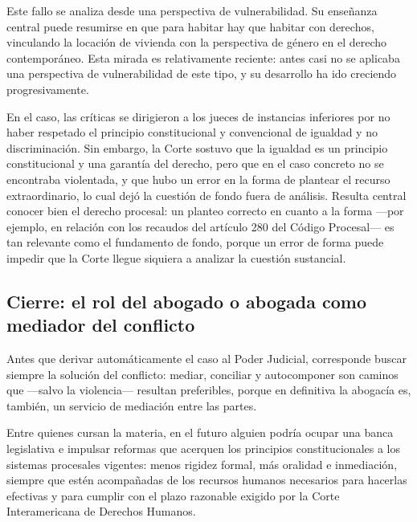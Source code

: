 \documentclass[12pt,oneside]{book}
\begin{document}
Este fallo se analiza desde una perspectiva de vulnerabilidad. Su enseñanza central puede resumirse en que para habitar hay que habitar con derechos, vinculando la locación de vivienda con la perspectiva de género en el derecho contemporáneo. Esta mirada es relativamente reciente: antes casi no se aplicaba una perspectiva de vulnerabilidad de este tipo, y su desarrollo ha ido creciendo progresivamente.

\begin{important}
En el caso, las críticas se dirigieron a los jueces de instancias inferiores por no haber respetado el principio constitucional y convencional de igualdad y no discriminación. Sin embargo, la Corte sostuvo que la igualdad es un principio constitucional y una garantía del derecho, pero que en el caso concreto no se encontraba violentada, y que hubo un error en la forma de plantear el recurso extraordinario, lo cual dejó la cuestión de fondo fuera de análisis. Resulta central conocer bien el derecho procesal: un planteo correcto en cuanto a la forma —por ejemplo, en relación con los recaudos del artículo 280 del Código Procesal— es tan relevante como el fundamento de fondo, porque un error de forma puede impedir que la Corte llegue siquiera a analizar la cuestión sustancial.
\end{important}

\subsection*{Cierre: el rol del abogado o abogada como mediador del conflicto}

Antes que derivar automáticamente el caso al Poder Judicial, corresponde buscar siempre la solución del conflicto: mediar, conciliar y autocomponer son caminos que —salvo la violencia— resultan preferibles, porque en definitiva la abogacía es, también, un servicio de mediación entre las partes.

\begin{note}
Entre quienes cursan la materia, en el futuro alguien podría ocupar una banca legislativa e impulsar reformas que acerquen los principios constitucionales a los sistemas procesales vigentes: menos rigidez formal, más oralidad e inmediación, siempre que estén acompañadas de los recursos humanos necesarios para hacerlas efectivas y para cumplir con el plazo razonable exigido por la Corte Interamericana de Derechos Humanos.
\end{note}

\end{document}
